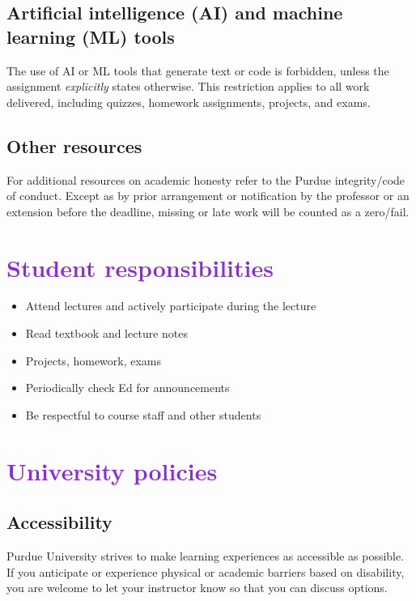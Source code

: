 \documentclass[letterpaper,11pt]{article}
\begin{document}
\subsection*{Artificial intelligence (AI) and machine learning (ML) tools}

The use of AI or ML tools that generate text or code is forbidden,
unless the assignment \emph{explicitly} states otherwise. This
restriction applies to all work delivered, including quizzes, homework
assignments, projects, and exams.

\subsection*{Other resources}
For additional resources on academic honesty refer to the Purdue
integrity/code of conduct. Except as by prior arrangement or
notification by the professor or an extension before the deadline,
missing or late work will be counted as a zero/fail.

\section*{\textcolor{BlueViolet}{Student responsibilities}}

\begin{itemize}
\item Attend lectures and actively participate during the lecture
\item Read textbook and lecture notes
\item Projects, homework, exams
\item Periodically check Ed for announcements
\item Be respectful to course staff and other students
\end{itemize}

\section*{\textcolor{BlueViolet}{University policies}}

\subsection*{Accessibility}
Purdue University strives to make learning experiences as accessible as
possible. If you anticipate or experience physical or academic barriers based on
disability, you are welcome to let your instructor know so that you can discuss
options.
\end{document}
